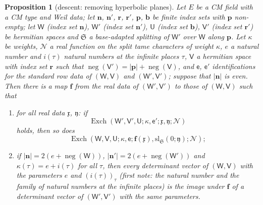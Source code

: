 \documentclass[11pt,a4paper]{article}
\theoremstyle{plainx}
\newtheorem{proposition}[theorem]{Proposition}
\theoremstyle{uprightx}
\newcommand{\bb}{\mathbf{b}}
\newcommand{\bn}{\mathbf{n}}
\newcommand{\br}{\mathbf{r}}
\newcommand{\bp}{\mathbf{p}}
\newcommand{\sW}{\mathsf{W}}
\newcommand{\sV}{\mathsf{V}}
\newcommand{\sU}{\mathsf{U}}
\newcommand{\se}{\mathsf{e}}
\newcommand{\fx}{\mathfrak{x}}
\newcommand{\fy}{\mathfrak{y}}
\newcommand{\fS}{\mathfrak{S}}
\newcommand{\Exch}[8]{\operatorname{Exch}(#1,#2,#3;#4,#5;#6,#7;#8)}
\newcommand{\negc}{\operatorname{neg}}
\begin{document}
\begin{proposition}[descent: removing hyperbolic planes]\label{p:descent}
Let $E$ be a CM field with a CM type and Weil data; let $\bn$, $\bn'$, $\br$, $\br'$, $\bp$, $\bb$ be finite index
sets with $\bp$ non-empty; let $\sW$ (index set $\bn$), $\sW'$ (index set $\bn'$), $\sU$ (index set $\bb$),
$\sV'$ (index set $\br'$) be hermitian spaces and $\fS$ a base-adapted splitting of $\sW'$ over $\sW$ along $\bp$.
Let $\kappa$ be weights, $\mathcal{N}$ a real function on the split tame characters of weight $\kappa$, $e$ a natural
number and $i(\tau)$ natural numbers at the infinite places $\tau$, $\sV$ a hermitian space with index set $\br$
such that $\negc(\sV')=|\bp|+\negc(\sV)$, and
$\se$, $\se'$ identifications for the standard row data of $(\sW,\sV)$ and $(\sW',\sV')$; suppose that $|\bn|$ is
even. Then there is a map $\mathbf{f}$ from the real data of $(\sW',\sV')$ to those of $(\sW,\sV)$ such that
\begin{enumerate}[label=\textup{(\arabic*)},leftmargin=2.3em,itemsep=1pt]
\item for all real data $\fx$, $\fy$: if
\[\Exch{\sW'}{\sV'}{\sU}{\kappa}{\se'}{\fx}{\fy}{\mathcal{N}}\]
holds, then so does
\[\Exch{\sW}{\sV}{\sU}{\kappa}{\se}{\mathbf{f}(\fx)}{\mathrm{sl}_{\fS}(0;\fy)}{\mathcal{N}};\]
\item if $|\bn|=2(e+\negc(\sW))$, $|\bn'|=2(e+\negc(\sW'))$ and $\kappa(\tau)=e+i(\tau)$ for all $\tau$, then every
determinant vector of $(\sW,\sV)$ with the parameters $e$ and $(i(\tau))_\tau$ (first note: the natural number and
the family of natural numbers at the infinite places) is the image under $\mathbf{f}$ of a determinant vector of
$(\sW',\sV')$ with the same parameters.
\end{enumerate}
\end{proposition}
\end{document}
